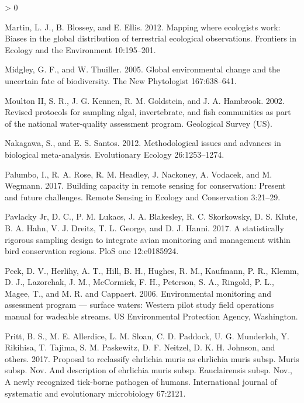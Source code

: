 \documentclass[
  12pt,
]{article}
\newlength{\cslhangindent}
\newenvironment{CSLReferences}[2] %
 {%
  \setlength{\parindent}{0pt}
  \ifodd #1 \everypar{\setlength{\hangindent}{\cslhangindent}}\ignorespaces\fi
  \ifnum #2 > 0
  \setlength{\parskip}{#2\baselineskip}
  \fi
 }%
 {}
\begin{document}
\begin{CSLReferences}{1}{0}
\leavevmode\hypertarget{ref-martin2012mapping}{}%
Martin, L. J., B. Blossey, and E. Ellis. 2012. Mapping where ecologists work: Biases in the global distribution of terrestrial ecological observations. Frontiers in Ecology and the Environment 10:195--201.

\leavevmode\hypertarget{ref-midgley2005global}{}%
Midgley, G. F., and W. Thuiller. 2005. Global environmental change and the uncertain fate of biodiversity. The New Phytologist 167:638--641.

\leavevmode\hypertarget{ref-moulton2002revised}{}%
Moulton II, S. R., J. G. Kennen, R. M. Goldstein, and J. A. Hambrook. 2002. Revised protocols for sampling algal, invertebrate, and fish communities as part of the national water-quality assessment program. Geological Survey (US).

\leavevmode\hypertarget{ref-nakagawa2012methodological}{}%
Nakagawa, S., and E. S. Santos. 2012. Methodological issues and advances in biological meta-analysis. Evolutionary Ecology 26:1253--1274.

\leavevmode\hypertarget{ref-palumbo2017building}{}%
Palumbo, I., R. A. Rose, R. M. Headley, J. Nackoney, A. Vodacek, and M. Wegmann. 2017. Building capacity in remote sensing for conservation: Present and future challenges. Remote Sensing in Ecology and Conservation 3:21--29.

\leavevmode\hypertarget{ref-pavlacky2017statistically}{}%
Pavlacky Jr, D. C., P. M. Lukacs, J. A. Blakesley, R. C. Skorkowsky, D. S. Klute, B. A. Hahn, V. J. Dreitz, T. L. George, and D. J. Hanni. 2017. A statistically rigorous sampling design to integrate avian monitoring and management within bird conservation regions. PloS one 12:e0185924.

\leavevmode\hypertarget{ref-peck2006environmental}{}%
Peck, D. V., Herlihy, A. T., Hill, B. H., Hughes, R. M., Kaufmann, P. R., Klemm, D. J., Lazorchak, J. M., McCormick, F. H., Peterson, S. A., Ringold, P. L., Magee, T., and M. R. and Cappaert. 2006. Environmental monitoring and assessment program --- surface waters: Western pilot study field operations manual for wadeable streams. US Environmental Protection Agency, Washington.

\leavevmode\hypertarget{ref-pritt2017proposal}{}%
Pritt, B. S., M. E. Allerdice, L. M. Sloan, C. D. Paddock, U. G. Munderloh, Y. Rikihisa, T. Tajima, S. M. Paskewitz, D. F. Neitzel, D. K. H. Johnson, and others. 2017. Proposal to reclassify ehrlichia muris as ehrlichia muris subsp. Muris subsp. Nov. And description of ehrlichia muris subsp. Eauclairensis subsp. Nov., A newly recognized tick-borne pathogen of humans. International journal of systematic and evolutionary microbiology 67:2121.


\end{CSLReferences}
\end{document}
